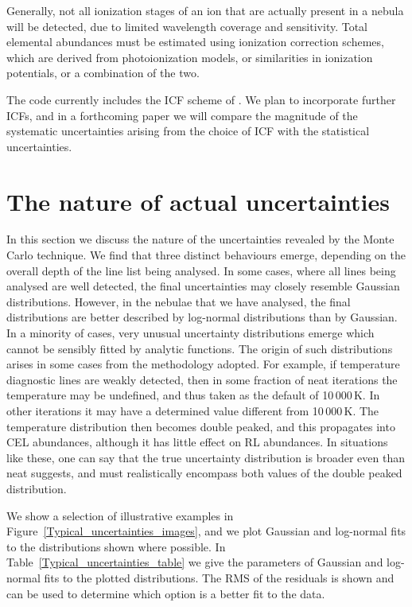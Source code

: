 \documentclass[useAMS,usenatbib]{mn2e}
\begin{document}
Generally, not all ionization stages of an ion that are actually present in a nebula will be detected, due to limited wavelength coverage and sensitivity.  Total elemental abundances must be estimated using ionization correction schemes, which are derived from photoionization models, or similarities in ionization potentials, or a combination of the two.

The code currently includes the ICF scheme of \citet{1994MNRAS.271..257K}.  We plan to incorporate further ICFs, and in a forthcoming paper we will compare the magnitude of the systematic uncertainties arising from the choice of ICF with the statistical uncertainties.

\section{The nature of actual uncertainties}
\label{natureofuncertainties}

In this section we discuss the nature of the uncertainties revealed by the Monte Carlo technique.  We find that three distinct behaviours emerge, depending on the overall depth of the line list being analysed.  In some cases, where all lines being analysed are well detected, the final uncertainties may closely resemble Gaussian distributions.  However, in the nebulae that we have analysed, the final distributions are better described by log-normal distributions than by Gaussian.  In a minority of cases, very unusual uncertainty distributions emerge which cannot be sensibly fitted by analytic functions.  The origin of such distributions arises in some cases from the methodology adopted.  For example, if temperature diagnostic lines are weakly detected, then in some fraction of {\sc neat} iterations the temperature may be undefined, and thus taken as the default of 10\,000\,K.  In other iterations it may have a determined value different from 10\,000\,K.  The temperature distribution then becomes double peaked, and this propagates into CEL abundances, although it has little effect on RL abundances.  In situations like these, one can say that the true uncertainty distribution is broader even than {\sc neat} suggests, and must realistically encompass both values of the double peaked distribution.

We show a selection of illustrative examples in Figure~\ref{Typical_uncertainties_images}, and we plot Gaussian and log-normal fits to the distributions shown where possible.  In Table~\ref{Typical_uncertainties_table} we give the parameters of Gaussian and log-normal fits to the plotted distributions.  The RMS of the residuals is shown and can be used to determine which option is a better fit to the data.
\end{document}
